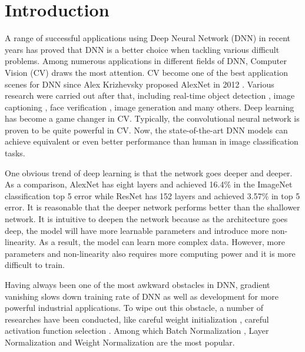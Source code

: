 \documentclass{sig-alternate}
\begin{document}

\section{Introduction}
    A range of successful applications using Deep Neural Network (DNN) in recent years has proved that DNN is a better choice when tackling various difficult problems. Among numerous applications in different fields of DNN, Computer Vision (CV) draws the most attention. CV become one of the best application scenes for DNN since Alex Krizhevsky proposed AlexNet in 2012 \cite{krizhevsky2012imagenet}. Various research were carried out after that, including real-time object detection \cite{ren2015faster}, image captioning \cite{vinyals2015show}, face verification \cite{taigman2014deepface}, image generation \cite{gregor2015draw} and many others. Deep learning has become a game changer in CV. Typically, the convolutional neural network is proven to be quite powerful in CV. Now, the state-of-the-art DNN models can achieve equivalent or even better performance than human in image classification tasks.

    One obvious trend of deep learning is that the network goes deeper and deeper. As a comparison, AlexNet has eight layers and achieved 16.4\% in the ImageNet classification top 5 error while ResNet \cite{he2015deep} has 152 layers and achieved 3.57\% in top 5 error. It is reasonable that the deeper network performs better than the shallower network. It is intuitive to deepen the network because as 
    the architecture goes deep, the model will have more learnable parameters and introduce more non-linearity. As a result, the model can learn more complex data. However, more parameters and non-linearity also requires more computing power and it is more difficult to train.

    Having always been one of the most awkward obstacles in DNN, gradient vanishing slows down training rate of DNN as well as development for more powerful industrial applications. To wipe out this obstacle, a number of researches have been conducted, like careful weight initialization \cite{sutskever2013importance}, careful activation function selection \cite{he2015delving}. Among which Batch Normalization \cite{ioffe2015batch}, Layer Normalization \cite{ba2016layer} and Weight Normalization \cite{salimans2016weight} are the most popular. 
\end{document}
